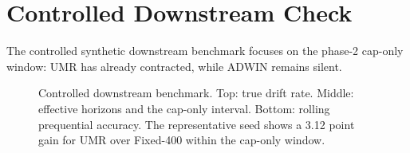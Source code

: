 \section{Controlled Downstream Check}\label{app:downstream_temporal_invalidity}

The controlled synthetic downstream benchmark focuses on the phase-2 cap-only
window: UMR has already contracted, while ADWIN remains silent.

\begin{figure}[!htbp]
\centering
{}
\caption{Controlled downstream benchmark. Top: true drift rate. Middle:
effective horizons and the cap-only interval. Bottom: rolling prequential
accuracy. The representative seed shows a 3.12 point gain for UMR over
Fixed-400 within the cap-only window.}
\label{fig:temporal_invalidity}
\end{figure}


